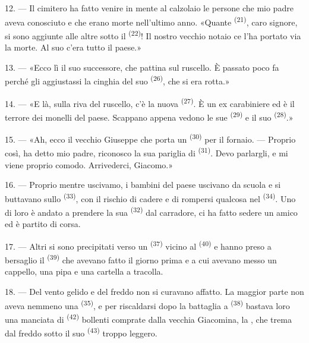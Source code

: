 12. --- Il cimitero ha fatto venire in mente al calzolaio le persone che mio padre
aveva conosciuto e che erano morte nell'ultimo anno. «Quante 
\textsuperscript{(21)}, caro signore, si sono aggiunte alle altre sotto il
 \textsuperscript{(22)}! Il nostro vecchio notaio ce l'ha portato via
la morte. Al suo  c'era tutto il paese.»

13. --- «Ecco lì il suo successore, che pattina sul ruscello. È passato poco fa perché
gli aggiustassi la cinghia del suo  \textsuperscript{(26)}, che si era
rotta.»

14. --- «E là, sulla riva del ruscello, c'è la nuova 
\textsuperscript{(27)}. È un ex carabiniere ed è il terrore dei monelli del paese.
Scappano appena vedono le sue  \textsuperscript{(29)} e il suo
 \textsuperscript{(28)}.»

15. --- «Ah, ecco il vecchio Giuseppe che porta un 
\textsuperscript{(30)} per il fornaio. --- Proprio così, ha detto mio padre, riconosco
la sua pariglia di  \textsuperscript{(31)}. Devo parlargli, e mi viene
proprio comodo. Arrivederci, Giacomo.»

16. --- Proprio mentre uscivamo, i bambini del paese uscivano da scuola e si buttavano
sullo  \textsuperscript{(33)}, con il rischio di cadere e
di rompersi qualcosa nel  \textsuperscript{(34)}. Uno di loro è
andato a prendere la sua  \textsuperscript{(32)} dal carradore, ci ha
fatto sedere un amico ed è partito di corsa.

17. --- Altri si sono precipitati verso un 
\textsuperscript{(37)} vicino al  \textsuperscript{(40)} e hanno preso a
bersaglio il  \textsuperscript{(39)} che avevano fatto il
giorno prima e a cui avevano messo un cappello, una pipa e una cartella a tracolla.

18. --- Del vento gelido e del freddo non si curavano affatto. La maggior parte non
aveva nemmeno una  \textsuperscript{(35)}, e per riscaldarsi dopo la
battaglia a  \textsuperscript{(38)} bastava loro una manciata di
 \textsuperscript{(42)} bollenti comprate dalla vecchia Giacomina, la
, che trema dal freddo sotto il suo 
\textsuperscript{(43)} troppo leggero.


